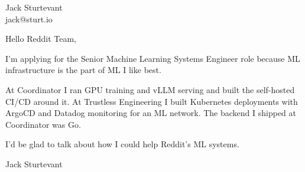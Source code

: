 \documentclass[11pt]{article}
\begin{document}
\raggedright

{\namefont\fontsize{20pt}{24pt}\selectfont Jack Sturtevant}\\[-0.3em]
jack@sturt.io

\vspace{1.2em}

Hello Reddit Team,

I'm applying for the Senior Machine Learning Systems Engineer role because ML infrastructure is the part of ML I like best.

At Coordinator I ran GPU training and vLLM serving and built the self-hosted CI/CD around it. At Trustless Engineering I built Kubernetes deployments with ArgoCD and Datadog monitoring for an ML network. The backend I shipped at Coordinator was Go.

I'd be glad to talk about how I could help Reddit's ML systems.

\vspace{0.6em}
Jack Sturtevant
\end{document}
